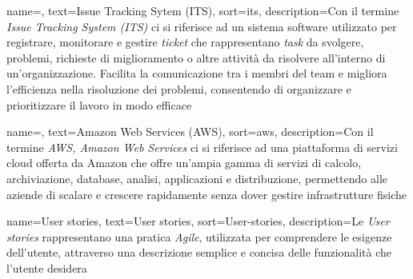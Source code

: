 






 {
    name=,
    text=Issue Tracking Sytem (ITS),
    sort=its,
    description={Con il termine \emph{Issue Tracking System (ITS) } ci si riferisce ad un sistema software utilizzato per registrare, monitorare e gestire \textit{ticket} che rappresentano \textit{task} da svolgere, problemi, richieste di miglioramento o altre attività da risolvere all’interno di un’organizzazione. Facilita la comunicazione tra i membri del team e migliora l’efficienza nella risoluzione dei problemi, consentendo di organizzare e prioritizzare il lavoro in modo efficace}
}

 {
    name=,
    text=Amazon Web Services (AWS),
    sort=aws,
    description={Con il termine \emph{AWS, Amazon Web Services} ci si riferisce ad una piattaforma di servizi cloud offerta da Amazon che offre un’ampia gamma di servizi di calcolo, archiviazione, database, analisi, applicazioni e distribuzione, permettendo alle aziende di scalare e crescere rapidamente senza dover gestire infrastrutture fisiche}
}

 {
    name=User stories,
    text=User stories,
    sort=User-stories,
    description={Le \emph{User stories} rappresentano una pratica \textit{Agile}, utilizzata per comprendere le esigenze dell'utente, attraverso una descrizione semplice e concisa delle funzionalità che l'utente desidera}
}


